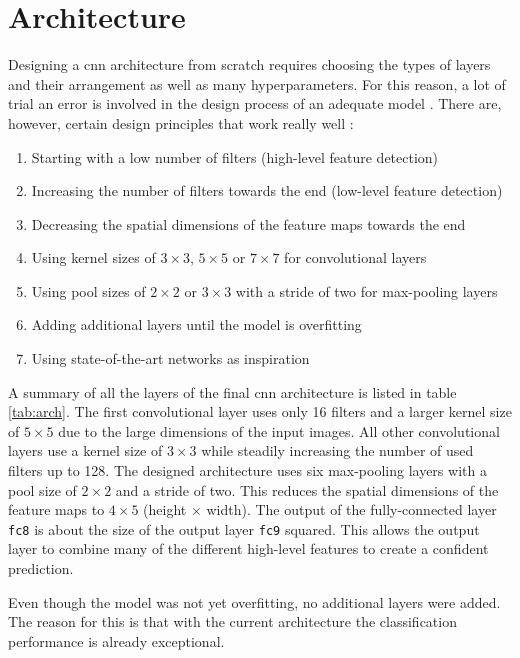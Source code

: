 \section{Architecture}
\label{sec:training_of_the_cnn:architecture}

Designing a \acrlong{cnn} architecture from scratch requires choosing the types of layers and their arrangement as well as many hyperparameters.
For this reason, a lot of trial an error is involved in the design process of an adequate model \cite{training_arch_design}.
There are, however, certain design principles that work really well \cite{training_arch_hyper}:

\begin{enumerate}
  \item Starting with a low number of filters (high-level feature detection)
  \item Increasing the number of filters towards the end (low-level feature detection)
  \item Decreasing the spatial dimensions of the feature maps towards the end
  \item Using kernel sizes of $3\times 3$, $5\times 5$ or $7\times 7$ for convolutional layers
  \item Using pool sizes of $2\times 2$ or $3\times 3$ with a stride of two for max-pooling layers
  \item Adding additional layers until the model is overfitting
  \item Using state-of-the-art networks as inspiration
\end{enumerate}

A summary of all the layers of the final \acrshort{cnn} architecture is listed in table \ref{tab:arch}.
The first convolutional layer uses only \num{16} filters and a larger kernel size of $5\times 5$ due to the large dimensions of the input images.
All other convolutional layers use a kernel size of $3\times 3$ while steadily increasing the number of used filters up to \num{128}.
The designed architecture uses six max-pooling layers with a pool size of $2\times 2$ and a stride of two.
This reduces the spatial dimensions of the feature maps to $4\times 5$ (height $\times$ width).
The output of the fully-connected layer \texttt{fc8} is about the size of the output layer \texttt{fc9} squared.
This allows the output layer to combine many of the different high-level features to create a confident prediction.

Even though the model was not yet overfitting, no additional layers were added.
The reason for this is that with the current architecture the classification performance is already exceptional.

